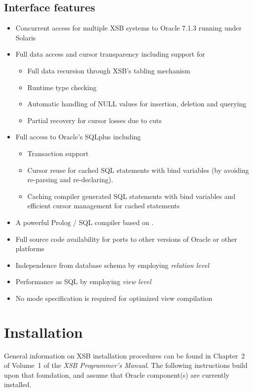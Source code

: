 \subsection{Interface features}
\begin{itemize} 
\item Concurrent access for multiple XSB systems to Oracle 7.1.3
	running under Solaris
\item Full data access and cursor transparency including support for
	\begin{itemize}
	\item Full data recursion through XSB's tabling mechanism
	\item Runtime type checking
	\item Automatic handling of NULL values for insertion, 
		deletion and querying
	\item Partial recovery for cursor losses due to cuts
	\end{itemize}
\item Full access to Oracle's SQLplus including
	\begin{itemize}
	\item Transaction support
	\item Cursor reuse for cached SQL statements 
		with bind variables (by avoiding re-parsing and re-declaring).
	\item Caching compiler generated SQL statements with bind variables 
		and efficient cursor management for cached statements
	\end{itemize}
\item A powerful Prolog / SQL compiler based on \cite{Drax92}.
\item Full source code availability for ports to other versions of
      Oracle or other platforms
\item Independence from database schema by employing {\it relation level}
\item Performance as SQL by employing {\it view level} 
\item No mode specification is required for optimized view compilation
\end{itemize}

\section{Installation}

General information on XSB installation procedures can be found in
Chapter~2 of Volume~1 of the \emph{XSB Programmer's Manual}.  The
following instructions build upon that foundation, and assume that
Oracle component(s) are currently installed.

